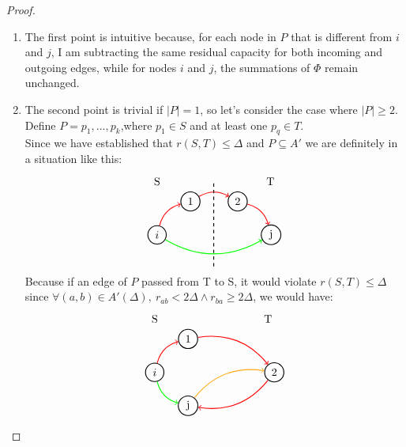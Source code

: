     \begin{proof}
        \begin{enumerate}
            \item The first point is intuitive because, for each node in $P$ that is different from $i$ and $j$, I am subtracting the same residual capacity for both incoming and outgoing edges, while for nodes $i$ and $j$, the summations of $\Phi$ remain unchanged.
            \item The second point is trivial if $|P|= 1$, so let's consider the case where $|P|\ge 2$. Define $P = p_1, ..., p_k$,where $p_1 \in S$ and at least one $p_q\in T$.\\
            Since we have established that $r(S,T) \le \Delta$ and $P\subseteq A'$ we are definitely in a situation like this:
                \[\begin{tikzpicture}[node distance={15mm}, thick , main/.style = {draw, circle}] 
                    \node[main] (0) {$i$};
                    \node[main] (1) [above right of = 0] {1};
                    \node[main] (2) [right of = 1] {2};
                    \node[main] (3) [below right of = 2] {j};
                    \node at (0,1.7) {S};
                    \node at (3.6,1.7) {T};

                    \draw[->] (0) [red, bend left] to (1);
                    \draw[->] (1) [red, bend left] to (2);
                    \draw[->] (2) [red, bend left] to (3);
                    \draw[->] (0) [green, bend right] to (3);

                    \draw[dashed] (1.8,-1) -- (1.8,1.7);
                \end{tikzpicture}\]
                Because if an edge of $P$ passed from T to S, it would violate $r(S,T)\le \Delta$ since $\forall (a,b)\in A'(\Delta),\ r_{ab} < 2\Delta \land r_{ba}\ge 2\Delta$, we would have:
                \[\begin{tikzpicture}[node distance={15mm}, thick , main/.style = {draw, circle}] 
                    \node[main] (0) {$i$};
                    \node[main] (1) [above right of = 0] {1};
                    \node[main] (2) at (3.8,0) {2};
                    \node[main] (3) [below right of = 0] {j};
                    \node at (0,1.7) {S};
                    \node at (3.6,1.7) {T};

                    \draw[->] (0) [red,bend left] to (1);
                    \draw[->] (1) [red,bend left] to (2);
                    \draw[->] (2) [red,bend left] to (3);
                    \draw[->] (3) [thick = 1.5, darktangerine, bend left] to (2);
                    \draw[->] (0) [green, bend right] to (3);


\end{tikzpicture}\]
\end{enumerate}
\end{proof}
